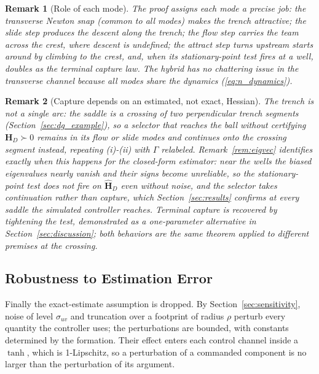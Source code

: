 \documentclass[lettersize,journal]{IEEEtran}
\newtheorem{remark}{Remark}
\begin{document}
\begin{remark}[Role of each mode]
The proof assigns each mode a precise job: the transverse Newton snap
(common to all modes) makes the trench attractive; the slide step produces the
descent along the trench; the flow step carries the team across the crest, where
descent is undefined; the attract step turns upstream starts around by climbing to
the crest, and, when its stationary-point test fires at a well, doubles as the
terminal capture law. The
hybrid has no chattering issue in the transverse channel because all
modes share the dynamics (\ref{eq:n_dynamics}).
\end{remark}

\begin{remark}[Capture depends on an estimated, not exact, Hessian]
\label{rem:capture_gap}
The trench is not a single arc: the saddle is a crossing of two
perpendicular trench segments (Section~\ref{sec:dg_example}), so a
selector that reaches the ball without certifying $\mathbf{H}_D \succ
0$ remains in its flow or slide modes and continues onto the crossing
segment instead, repeating (i)-(ii) with $\Gamma$ relabeled.
Remark~\ref{rem:eigvec} identifies exactly when this happens for the
closed-form estimator: near the wells the biased eigenvalues nearly
vanish and their signs become unreliable, so the stationary-point test
does not fire on $\hat{\mathbf{H}}_D$ even without noise, and the
selector takes continuation rather than capture, which
Section~\ref{sec:results} confirms at every saddle the simulated
controller reaches. Terminal capture is recovered by tightening the
test, demonstrated as a one-parameter alternative in
Section~\ref{sec:discussion}; both behaviors are the same theorem
applied to different premises at the crossing.
\end{remark}

\subsection{Robustness to Estimation Error}
\label{sec:stab_iss}

Finally the exact-estimate assumption is dropped. By
Section~\ref{sec:sensitivity}, noise of level $\sigma_{uv}$ and
truncation over a footprint of radius $\rho$ perturb every quantity the
controller uses; the perturbations are bounded, with constants
determined by the formation. Their effect enters each control channel
inside a $\tanh$, which is 1-Lipschitz, so a perturbation of a
commanded component is no larger than the perturbation of its argument.
\end{document}
